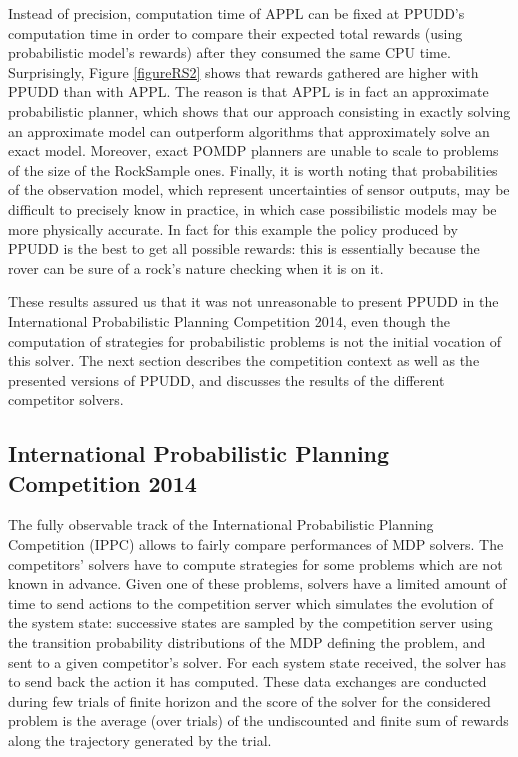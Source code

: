 Instead of precision, computation
time of APPL can be fixed at PPUDD's computation time in order to compare their
expected total rewards (using probabilistic model's rewards) 
after they consumed the same CPU time. 
Surprisingly, Figure \ref{figureRS2} shows that rewards gathered are higher with
PPUDD than with APPL. The reason is that APPL is in fact an approximate
probabilistic planner, which shows that our approach consisting in exactly
solving an approximate model can outperform algorithms that approximately solve
an exact model. 
Moreover, exact POMDP planners are
unable to scale to problems of the size of the RockSample ones.
Finally, it is worth noting that probabilities of the
observation model, which represent uncertainties of sensor outputs, may be
difficult to precisely know in practice, in which case possibilistic models may
be more physically accurate. 
In fact for this example the policy produced by
PPUDD is the best to get all possible rewards: this is essentially because the
rover can be sure of a rock's nature checking 
when it is on it.

These results assured us that it was not unreasonable to present PPUDD
in the International Probabilistic Planning Competition 2014,
even though the computation of strategies for probabilistic problems 
is not the initial vocation of this solver.
The next section describes the competition context
as well as the presented versions of PPUDD,
and discusses the results of the different competitor solvers.

\subsection{International Probabilistic Planning Competition 2014}



The fully observable track 
of the International Probabilistic Planning Competition (IPPC) 
allows to fairly compare performances of MDP solvers.
The competitors' solvers have to compute 
strategies for some problems 
which are not known in advance.
Given one of these problems, 
solvers have a limited amount of time 
to send actions to the competition server 
which simulates the evolution of the system state:
successive states are sampled by the competition server
using the transition probability 
distributions of the MDP defining the problem, 
and sent to a given competitor's solver.
For each system state received, the solver 
has to send back the action
it has computed.
These data exchanges are conducted 
during few trials of finite horizon and
the score of the solver for the considered problem 
is the average (over trials) 
of the undiscounted and finite sum of 
rewards along the trajectory generated by the trial.

